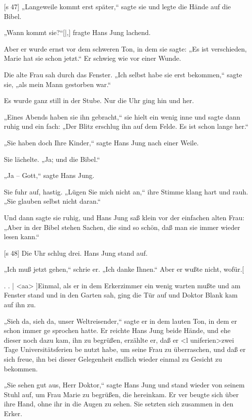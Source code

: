 [s 47]
„Langeweile kommt erst später,“ sagte sie und
legte die Hände auf die Bibel.

„Wann kommt sie?“[|,] fragte Hans Jung lachend.

Aber er wurde ernst vor dem schweren Ton,
in dem sie sagte: „Es ist verschieden, Marie hat
sie schon jetzt.“ Er schwieg wie vor einer Wunde.

Die alte Frau sah durch das Fenster. „Ich selbst
habe sie erst bekommen,“ sagte sie, „als mein Mann
gestorben war.“

Es wurde ganz still in der Stube. Nur die Uhr
ging hin und her.

„Eines Abends haben sie ihn gebracht,“ sie
hielt ein wenig inne und sagte dann ruhig und ein­
fach: „Der Blitz erschlug ihn auf dem Felde. Es ist
schon lange her.“

„Sie haben doch Ihre Kinder,“ sagte Hans Jung
nach einer Weile.

Sie lächelte. „Ja; und die Bibel.“

„Ja – Gott,“ sagte Hans Jung.

Sie fuhr auf, hastig. „Lügen Sie mich nicht an,“
ihre Stimme klang hart und rauh. „Sie glauben selbst
nicht daran.“

Und dann sagte sie ruhig, und Hans Jung saß
klein vor der einfachen alten Frau: „Aber in der
Bibel stehen Sachen, die sind so schön, daß man sie
immer wieder lesen kann.“

[s 48]
Die Uhr schlug drei. Hans Jung stand auf.

„Ich muß jetzt gehen,“ schrie er. „Ich danke
Ihnen.“ Aber er wußte nicht, wofür.[

. . |
<aa>
]Einmal, als er in dem Erkerzimmer ein wenig
warten mußte und am Fenster stand und in den
Garten sah, ging die Tür auf und Doktor Blank
kam auf ihn zu.

„Sieh da, sieh da, unser Weltreisender,“ sagte
er in dem lauten Ton, in dem er schon immer ge­
sprochen hatte. Er reichte Hans Jung beide Hände,
und ehe dieser noch dazu kam, ihn zu begrüßen,
erzählte er, daß er <l uniferien>zwei Tage Universitätsferien be­
nutzt habe, um seine Frau zu überraschen, und daß
er sich freue, ihn bei dieser Gelegenheit endlich
wieder einmal zu Gesicht zu bekommen.

„Sie sehen gut aus, Herr Doktor,“ sagte Hans
Jung und stand wieder von seinem Stuhl auf, um
Frau Marie zu begrüßen, die hereinkam. Er ver­
beugte sich über ihre Hand, ohne ihr in die Augen
zu sehen. Sie setzten sich zusammen in den Erker.

